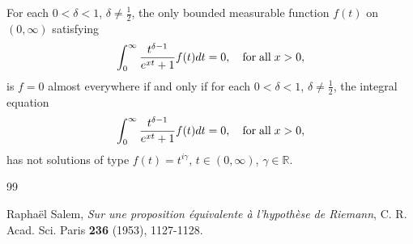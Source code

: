 \documentclass[11pt]{article}
\theoremstyle{remark}
\begin{document}
For each $0< \delta <1$, $\delta \neq \frac{1}{2}$, the only bounded measurable function $f(t)$ on $(0,\infty )$ satisfying
\[
\int_{0}^{\infty}\frac{t^{\delta -1}}{e^{xt}+1} f(t) dt =0,\quad \textrm{for\;all} \;x>0 ,
\] 
is $f =0$ almost everywhere if and only if for each $0<\delta <1$, $\delta \neq \frac{1}{2}$,
the integral equation
\[
\int_{0}^{\infty}\frac{t^{\delta -1}}{e^{xt}+1} f(t) dt =0,\quad \textrm{for\;all}\;x>0,
\]
has not solutions of type $f(t) = t^{i\gamma}$, $t\in (0,\infty )$, $\gamma \in\mathbb{R}$.




\begin{thebibliography}{99}

Rapha\"el Salem,
\textit{Sur une proposition équivalente à l'hypothèse de Riemann},
C. R. Acad. Sci. Paris \textbf{236} (1953), 1127-1128.



\end{thebibliography}
\end{document}
